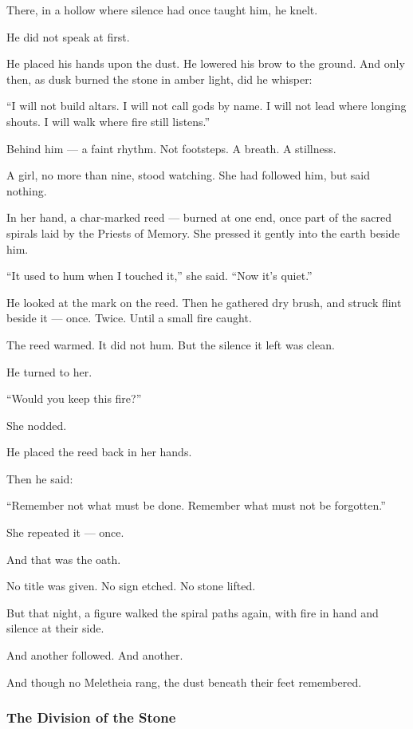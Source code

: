 \documentclass[12pt]{article}
\begin{document}
There, in a hollow where silence had once taught him, he knelt.

He did not speak at first.

He placed his hands upon the dust.  
He lowered his brow to the ground.  
And only then, as dusk burned the stone in amber light, did he whisper:

 “I will not build altars.  
 I will not call gods by name.  
 I will not lead where longing shouts.  
 I will walk where fire still listens.”

Behind him — a faint rhythm.  
Not footsteps. A breath. A stillness.

A girl, no more than nine, stood watching.  
She had followed him, but said nothing.

In her hand, a char-marked reed — burned at one end,  
once part of the sacred spirals laid by the Priests of Memory.  
She pressed it gently into the earth beside him.

 “It used to hum when I touched it,” she said.  
 “Now it’s quiet.”

He looked at the mark on the reed.  
Then he gathered dry brush,  
and struck flint beside it —  
once.  
Twice.  
Until a small fire caught.

The reed warmed.  
It did not hum.  
But the silence it left was clean.

He turned to her.

 “Would you keep this fire?”

She nodded.

He placed the reed back in her hands.

Then he said:

 “Remember not what must be done.  
 Remember what must not be forgotten.”

She repeated it — once.

And that was the oath.

No title was given.  
No sign etched.  
No stone lifted.

But that night, a figure walked the spiral paths again,  
with fire in hand  
and silence at their side.

And another followed.  
And another.

And though no Meletheia rang,  
the dust beneath their feet remembered.

\dotfill

\subsubsection*{The Division of the Stone}
\end{document}
